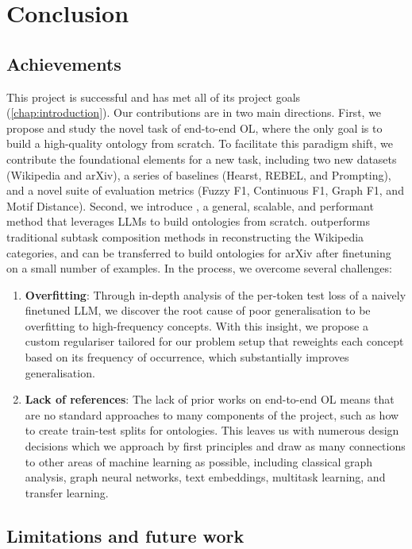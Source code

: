 \chapter{Conclusion}

\section{Achievements}

This project is successful and has met all of its project goals (\cref{chap:introduction}). Our contributions are in two main directions. First, we propose and study the novel task of end-to-end OL, where the only goal is to build a high-quality ontology from scratch. To facilitate this paradigm shift, we contribute the foundational elements for a new task, including two new datasets (Wikipedia and arXiv), a series of baselines (Hearst, REBEL, and Prompting), and a novel suite of evaluation metrics (Fuzzy F1, Continuous F1, Graph F1, and Motif Distance). Second, we introduce \name, a general, scalable, and performant method that leverages LLMs to build ontologies from scratch. \name outperforms traditional subtask composition methods in reconstructing the Wikipedia categories, and can be transferred to build ontologies for arXiv after finetuning on a small number of examples. In the process, we overcome several challenges:
\begin{enumerate}
    \item \textbf{Overfitting}: Through in-depth analysis of the per-token test loss of a naively finetuned LLM, we discover the root cause of poor generalisation to be overfitting to high-frequency concepts. With this insight, we propose a custom regulariser tailored for our problem setup that reweights each concept based on its frequency of occurrence, which substantially improves generalisation.
    \item \textbf{Lack of references}: The lack of prior works on end-to-end OL means that are no standard approaches to many components of the project, such as how to create train-test splits for ontologies. This leaves us with numerous design decisions which we approach by first principles and draw as many connections to other areas of machine learning as possible, including classical graph analysis, graph neural networks, text embeddings, multitask learning, and transfer learning.
\end{enumerate}


\section{Limitations and future work}

